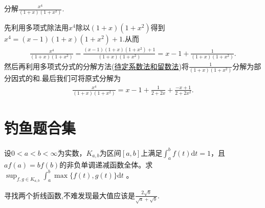 \documentclass[lang=cn,newtx,10pt,scheme=chinese]{elegantbook}
\begin{document}
\begin{example}
分解$\frac{x^4}{(1+x)(1+x^2)}$.
\end{example}
\begin{solution}
先利用多项式除法用$x^4$除以$(1+x)(1+x^2)$得到$x^4=\left( x-1 \right) \left( 1+x \right) \left( 1+x^2 \right) +1$.从而
\begin{align*}
\frac{x^4}{\left( 1+x \right) \left( 1+x^2 \right)}=\frac{\left( x-1 \right) \left( 1+x \right) \left( 1+x^2 \right) +1}{\left( 1+x \right) \left( 1+x^2 \right)}=x-1+\frac{1}{\left( 1+x \right) \left( 1+x^2 \right)}.
\end{align*}
然后再利用多项式分式的分解方法(\hyperref[将多项式分式分解为其部分因式的和常用方法]{待定系数法和留数法})将$\frac{1}{\left( 1+x \right) \left( 1+x^2 \right)}$分解为部分因式的和.最后我们可将原式分解为
\begin{align*}
\frac{x^4}{\left( 1+x \right) \left( 1+x^2 \right)}=x-1+\frac{1}{2+2x}+\frac{-x+1}{2+2x^2}.
\end{align*}
\end{solution}




\chapter{钓鱼题合集}

\begin{example}
设\(0 < a < b < \infty\)为实数，\(K_{a,b}\)为区间\([a,b]\)上满足\(\int_{a}^{b}f(t)\mathrm{d}t = 1\)，且\(af(a)=bf(b)\)的非负单调递减函数全体。求\(\sup_{f,g\in K_{a,b}}\int_{a}^{b}\max\{f(t),g(t)\}\mathrm{d}t\) 。
\end{example}
\begin{note}
寻找两个折线函数,不难发现最大值应该是$\frac{2\sqrt{b}}{\sqrt{a}+\sqrt{b}}$.
\end{note}
\end{document}
